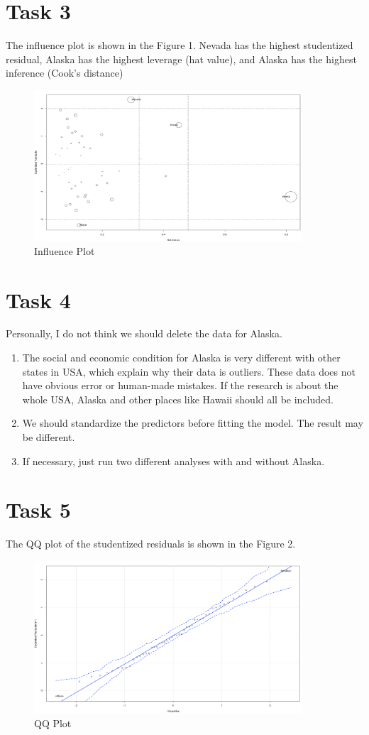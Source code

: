 \documentclass[doc,biblatex,apacite]{apa6}
\begin{document}
\section{Task 3}

The influence plot is shown in the Figure 1.
Nevada has the highest studentized residual, Alaska has the highest leverage (hat value), and Alaska has the highest inference (Cook’s distance)
\begin{figure}
    \centering
    \includegraphics[width=10cm]{influence_plot.png}
    \caption{Influence Plot}
\end{figure}


\section{Task 4}
Personally, I do not think we should delete the data for Alaska. 

\begin{enumerate}
    \item The social and economic condition for Alaska is very different with other states in USA, which explain why their data is outliers. 
    These data does not have obvious error or human-made mistakes. 
    If the research is about the whole USA, Alaska and other places like Hawaii should all be included. 
    \item We should standardize the predictors before fitting the model. The result may be different.
    \item If necessary, just run two different analyses with and without Alaska.
    
\end{enumerate}

\section{Task 5}
The QQ plot of the studentized residuals is shown in the Figure 2.
\begin{figure}
    \centering
    \includegraphics[width=10cm]{qqplot.png}
    \caption{QQ Plot}
\end{figure}
\end{document}
